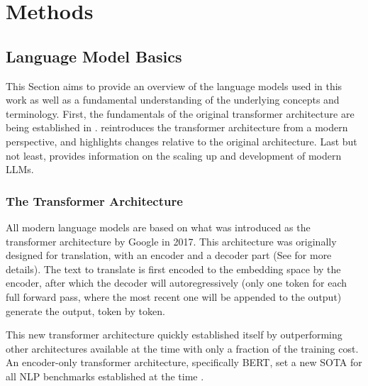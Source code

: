 \chapter{Methods}\label{chap:methods}


\section{Language Model Basics}\label{sec:basics}
This Section aims to provide an overview of the language models used in this work as well as a fundamental understanding of the underlying concepts and terminology.
First, the fundamentals of the original transformer architecture are being established in .
 reintroduces the transformer architecture from a modern perspective, and highlights changes relative to the original architecture.
Last but not least,  provides information on the scaling up and development of modern \glspl{LLM}.



\subsection{The Transformer Architecture}\label{sub:transformer}
All modern language models are based on what was introduced as the transformer architecture \cite{vaswani_attention_2017} by \gls{Google} in 2017.
This architecture was originally designed for translation, with an encoder and a decoder part (See  for more details).
The text to translate is first encoded to the embedding space by the encoder, after which the decoder will autoregressively (only one token for each full forward pass, where the most recent one will be appended to the output) generate the output, token by token.

This new transformer architecture quickly established itself by outperforming other architectures available at the time with only a fraction of the training cost.
An encoder-only transformer architecture, specifically \gls{BERT}, set a new \gls{SOTA} for all \gls{NLP} benchmarks established at the time \cite{devlin_bert_2018}.

